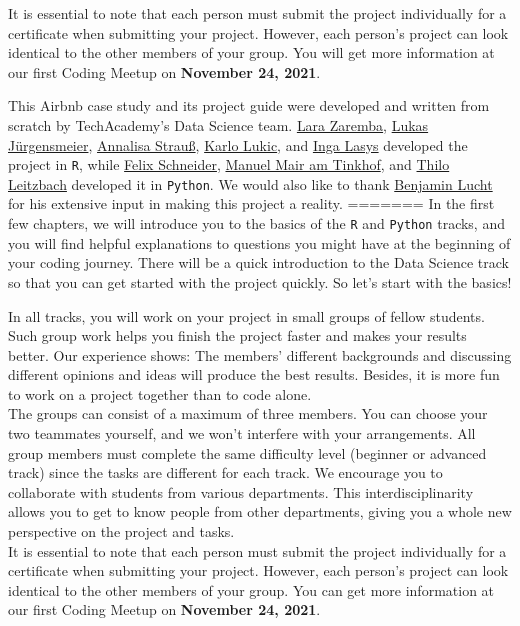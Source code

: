 \documentclass[
  11pt,
]{article}
\begin{document}
It is essential to note that each person must submit the project individually for a certificate when submitting your project.
However, each person's project can look identical to the other members of your group.
You will get more information at our first Coding Meetup on \textbf{November 24, 2021}.

This Airbnb case study and its project guide were developed and written from scratch by TechAcademy's Data Science team.
\href{linkedin.com/in/lara-zaremba}{Lara Zaremba}, \href{linkedin.com/in/lukas-juergensmeier}{Lukas Jürgensmeier}, \href{linkedin.com/in/annalisastrauss}{Annalisa Strauß}, \href{linkedin.com/in/karlo-lukic}{Karlo Lukic}, and \href{linkedin.com/in/inga-l-544713180}{Inga Lasys} developed the project in \texttt{R}, while \href{linkedin.com/in/flxschneider}{Felix Schneider}, \href{linkedin.com/in/manuel-mair-am-tinkhof-7b764111b}{Manuel Mair am Tinkhof}, and \href{linkedin.com/in/thilo-leitzbach}{Thilo Leitzbach} developed it in \texttt{Python}.
We would also like to thank \href{linkedin.com/in/benjamin-lucht}{Benjamin Lucht} for his extensive input in making this project a reality.
=======
In the first few chapters, we will introduce you to the basics of the \texttt{R} and \texttt{Python} tracks, and you will find helpful explanations to questions you might have at the beginning of your coding journey. There will be a quick introduction to the Data Science track so that you can get started with the project quickly. So let's start with the basics!

In all tracks, you will work on your project in small groups of fellow students. Such group work helps you finish the project faster and makes your results better. Our experience shows: The members' different backgrounds and discussing different opinions and ideas will produce the best results. Besides, it is more fun to work on a project together than to code alone.\\
The groups can consist of a maximum of three members. You can choose your two teammates yourself, and we won't interfere with your arrangements. All group members must complete the same difficulty level (beginner or advanced track) since the tasks are different for each track. We encourage you to collaborate with students from various departments. This interdisciplinarity allows you to get to know people from other departments, giving you a whole new perspective on the project and tasks.\\
It is essential to note that each person must submit the project individually for a certificate when submitting your project. However, each person's project can look identical to the other members of your group. You can get more information at our first Coding Meetup on \textbf{November 24, 2021}.
\end{document}
